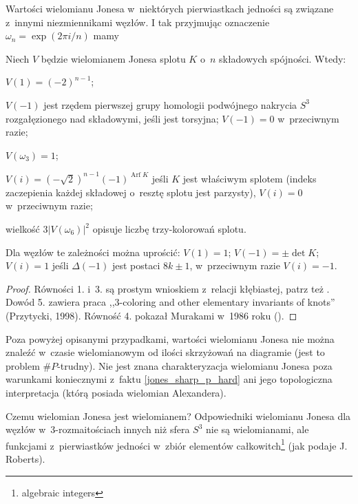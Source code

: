 Wartości wielomianu Jonesa w~niektórych pierwiastkach jedności są związane z~innymi niezmiennikami węzłów.
I tak przyjmując oznaczenie $\omega_n = \exp(2\pi i/n)$ mamy

\begin{proposition} \label{jones_sharp_p_hard}
    Niech $V$ będzie wielomianem Jonesa splotu $K$ o~$n$ składowych spójności.
    Wtedy:
    \begin{compactenum}
        \item $V(1) = (-2)^{n-1}$;
        \item $V(-1)$ jest rzędem pierwszej grupy homologii podwójnego nakrycia $S^3$ rozgałęzionego nad składowymi, jeśli jest torsyjna; $V(-1) = 0$ w~przeciwnym razie;
        \item $V(\omega_3) = 1$;
        \item $V(i) = (-\sqrt 2)^{n-1}(-1)^{\operatorname{Arf} K}$ jeśli $K$ jest właściwym splotem (indeks zaczepienia każdej składowej o~resztę splotu jest parzysty), $V(i) = 0$ w~przeciwnym razie;
        \item wielkość $3|V(\omega_6)|^2$ opisuje liczbę trzy-kolorowań splotu.
    \end{compactenum}
    Dla węzłów te zależności można uprościć: $V(1) = 1$; $V(-1) = \pm \det K$; $V(i) = 1$ jeśli $\Delta(-1)$ jest postaci $8k \pm 1$, w~przeciwnym razie $V(i) = -1$.
\end{proposition}

\begin{proof}
    Równości 1. i~3. są prostym wnioskiem z~relacji kłębiastej, patrz też \cite{jones87}.
    Dowód 5. zawiera praca ,,3-coloring and other elementary invariants of knots'' (Przytycki, 1998).
    Równość 4. pokazał Murakami w~1986 roku (\cite{murakami86}).
\end{proof}

Poza powyżej opisanymi przypadkami, wartości wielomianu Jonesa nie można znaleźć w~czasie wielomianowym od ilości skrzyżowań na diagramie (jest to problem $\#P$-trudny).
Nie jest znana charakteryzacja wielomianu Jonesa poza warunkami koniecznymi z~faktu \ref{jones_sharp_p_hard} ani jego topologiczna interpretacja (którą posiada wielomian Alexandera).

Czemu wielomian Jonesa jest wielomianem?
Odpowiedniki wielomianu Jonesa dla węzłów w~3-rozmaitościach innych niż sfera $S^3$ nie są wielomianami, ale funkcjami z~pierwiastków jedności w~zbiór elementów całkowitch\footnote{algebraic integers} (jak podaje J. Roberts).

